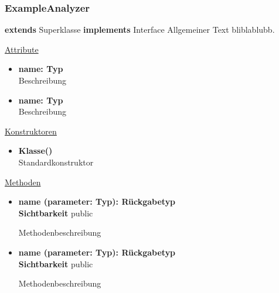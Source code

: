 \subsubsection{ExampleAnalyzer}
\textbf{extends} Superklasse \newline
\textbf{implements} Interface \newline
Allgemeiner Text bliblablubb. \newline

\underline{Attribute}
\begin{itemize}
\itemsep0pt
\item \textbf{name: Typ} \hfill\\ 
Beschreibung

\item \textbf{name: Typ} \hfill\\ 
Beschreibung
\end{itemize}

\underline{Konstruktoren}
\begin{itemize}
\itemsep0pt
\item \textbf{Klasse()} \hfill\\
Standardkonstruktor
\end{itemize}

\underline{Methoden}
\begin{itemize}
\itemsep0pt
\item \textbf{name (parameter: Typ): Rückgabetyp}\hfill\\
\textbf{Sichtbarkeit} public

Methodenbeschreibung

\item \textbf{name (parameter: Typ): Rückgabetyp}\hfill\\
\textbf{Sichtbarkeit} public

Methodenbeschreibung

\end{itemize}